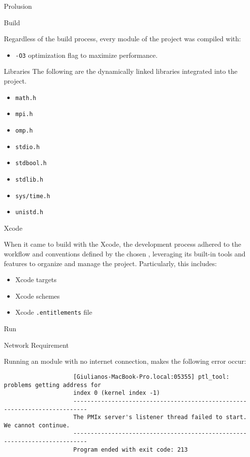 \begin{chapter}{Prolusion}
\begin{section}{Build}
		\par Regardless of the build process, every module of the project was compiled with:
		\begin{itemize}
			\item \texttt{-O3} optimization flag to maximize performance.
		\end{itemize}
		\begin{subsection}{Libraries}
			The following are the dynamically linked libraries integrated into the project.
			\begin{itemize}
				\item \texttt{math.h}
				\item \texttt{mpi.h}
				\item \texttt{omp.h}
				\item \texttt{stdio.h}
				\item \texttt{stdbool.h}
				\item \texttt{stdlib.h}
				\item \texttt{sys/time.h}
				\item \texttt{unistd.h}
			\end{itemize}
		\end{subsection}
		\begin{subsection}{Xcode}
			\par When it came to build with the Xcode, the development process adhered to the workflow and conventions defined by the chosen , leveraging its built-in tools and features to organize and manage the project. Particularly, this includes:
			\begin{itemize}
				\item Xcode targets
				\item Xcode schemes
				\item Xcode \texttt{.entitlements} file
			\end{itemize}
		\end{subsection}
	\end{section}
	\clearpage
	\begin{section}{Run}
		\begin{subsection}{Network Requirement}
			\par Running an  module with no internet connection, makes the following error occur:
			\begin{verbatim}
					[Giulianos-MacBook-Pro.local:05355] ptl_tool: problems getting address for
					index 0 (kernel index -1)
					--------------------------------------------------------------------------
					The PMIx server's listener thread failed to start. We cannot continue.
					--------------------------------------------------------------------------
					Program ended with exit code: 213
			\end{verbatim}
		\end{subsection}
	\end{section}
\end{chapter}